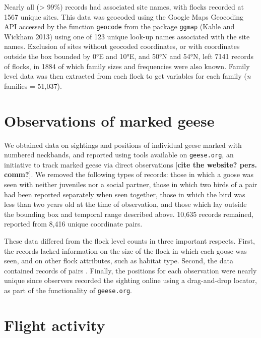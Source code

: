 \documentclass[twocolumn]{article}
\begin{document}
Nearly all (\textgreater{} 99\%) records had associated site names, with
flocks recorded at 1567 unique sites. This data was geocoded using the
Google Maps Geocoding API accessed by the function \texttt{geocode} from
the package \texttt{ggmap} (Kahle and Wickham 2013) using one of 123
unique look-up names associated with the site names. Exclusion of sites
without geocoded coordinates, or with coordinates outside the box
bounded by 0°E and 10°E, and 50°N and 54°N, left 7141 records of flocks,
in 1884 of which family sizes and frequencies were also known. Family
level data was then extracted from each flock to get variables for each
family (\emph{n} families = 51,037).

\section{Observations of marked
geese}\label{observations-of-marked-geese}

We obtained data on sightings and positions of individual geese marked
with numbered neckbands, and reported using tools available on
\texttt{geese.org}, an initiative to track marked geese via direct
observations {[}\textbf{cite the website? pers. comm?}{]}. We removed
the following types of records: those in which a goose was seen with
neither juveniles nor a social partner, those in which two birds of a
pair had been reported separately when seen together, those in which the
bird was less than two years old at the time of observation, and those
which lay outside the bounding box and temporal range described above.
10,635 records remained, reported from 8,416 unique coordinate pairs.

These data differed from the flock level counts in three important
respects. First, the records lacked information on the size of the flock
in which each goose was seen, and on other flock attributes, such as
habitat type. Second, the data contained records of pairs . Finally, the
positions for each observation were nearly unique since observers
recorded the sighting online using a drag-and-drop locator, as part of
the functionality of \texttt{geese.org}.

\section{Flight activity}\label{flight-activity}
\end{document}
